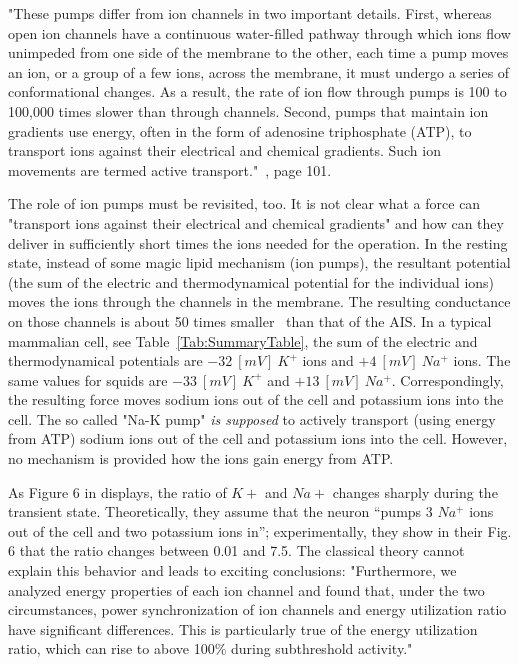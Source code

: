 "These pumps differ from ion channels in two
important details. First, whereas open ion channels
have a continuous water-filled pathway through which
ions flow unimpeded from one side of the membrane
to the other, each time a pump moves an ion, or a group
of a few ions, across the membrane, it must undergo a
series of conformational changes. As a result, the rate of
ion flow through pumps is 100 to 100,000 times slower
than through channels. Second, pumps that maintain
ion gradients use energy, often in the form of adenosine triphosphate (ATP), to transport ions against their
electrical and chemical gradients. Such ion movements
are termed active transport."~\cite{PrinciplesNeuralScience:2013}, page 101.


The role of ion pumps must be revisited, too.
It is not clear what a force can "transport ions against their
electrical and chemical gradients" and how can they deliver in
sufficiently short times the ions needed for the operation.
In the resting state, instead of some magic lipid mechanism (ion pumps), the resultant potential
(the sum of the electric and thermodynamical potential for the individual ions) moves the ions through the channels in the membrane.
The resulting conductance on those channels
is about 50 times smaller~\cite{ActionPotentialGenerationNatrium:2008,AIS_Updated_Viewpoint:2018} than that of the \gls{AIS}.
In a typical mammalian cell, see Table~\ref{Tab:SummaryTable},
the sum of the electric and thermodynamical potentials are $-32\ [mV]\ K^+$ ions and $+4\ [mV]\ Na^+$ ions.
The same values for squids are $-33\ [mV]\ K^+$ and $+13\ [mV]\ Na^+$.
Correspondingly, the resulting force moves sodium ions out of the cell and potassium ions into the cell.
The so called "Na-K pump" \textit{is supposed} to actively transport (using energy from \gls{ATP})
sodium ions out of the cell and potassium ions into the cell.
However, no mechanism is provided how the ions gain energy from \gls{ATP}.

As Figure 6 in \cite{NeuralEnergyConsumption:2017} displays,
the ratio of $K+$ and $Na+$ changes sharply during the transient state.
Theoretically, they assume that the neuron “pumps 3 $Na^+$ ions out of the cell and two potassium ions in”; experimentally, they show in their Fig. 6 that the ratio changes between 0.01 and 7.5.
The classical theory cannot explain this behavior and leads
to exciting conclusions:
"Furthermore, we analyzed energy properties of each ion channel and found that, under the two circumstances, power synchronization of ion channels and energy utilization ratio have significant differences. This is particularly true of the energy utilization ratio, which can rise to above 100\% during subthreshold activity."~\cite{NeuralEnergyConsumption:2017}

